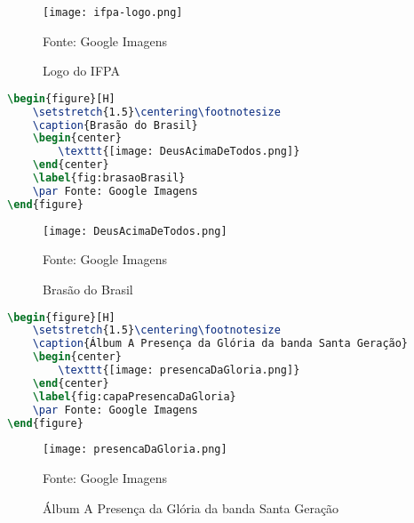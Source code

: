 \hfill

\begin{figure}[H]
    \centering\footnotesize
    \caption{Logo do IFPA}
    \begin{center}
        \texttt{[image: ifpa-logo.png]}
    \end{center}
    \label{fig:logoIFPA}
    \par Fonte: Google Imagens
\end{figure}


\begin{lstlisting}[language=TeX, caption=Codigo da Imagem do Brasao]
\begin{figure}[H]
    \setstretch{1.5}\centering\footnotesize
    \caption{Brasão do Brasil}
    \begin{center}
        \texttt{[image: DeusAcimaDeTodos.png]}
    \end{center}
    \label{fig:brasaoBrasil}
    \par Fonte: Google Imagens
\end{figure}
\end{lstlisting}

\hfill

\begin{figure}[H]
    \centering\footnotesize
    \caption{Brasão do Brasil}
    \begin{center}
        \texttt{[image: DeusAcimaDeTodos.png]}
    \end{center}
    \label{fig:brasaoBrasil}
    \par Fonte: Google Imagens
\end{figure}

\begin{lstlisting}[language=TeX, caption=Codigo da Imagem do Album]
\begin{figure}[H]
    \setstretch{1.5}\centering\footnotesize
    \caption{Álbum A Presença da Glória da banda Santa Geração}
    \begin{center}
        \texttt{[image: presencaDaGloria.png]}
    \end{center}
    \label{fig:capaPresencaDaGloria}
    \par Fonte: Google Imagens
\end{figure}
\end{lstlisting}

\begin{figure}[H]
    \centering\footnotesize
    \caption{Álbum A Presença da Glória da banda Santa Geração}
    \begin{center}
        \texttt{[image: presencaDaGloria.png]}
    \end{center}
    \label{fig:capaPresencaDaGloria}
    \par Fonte: Google Imagens
\end{figure}
		

